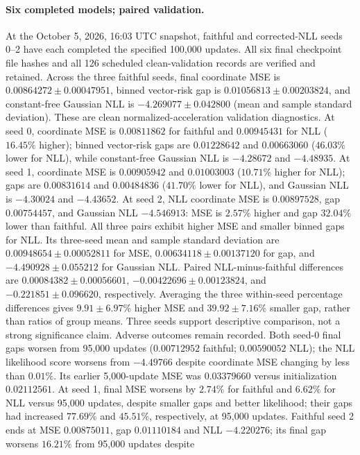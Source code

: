 \paragraph{Six completed models; paired validation.}
At the October 5, 2026, 16:03 UTC snapshot, faithful and corrected-NLL
seeds 0--2 have each completed the specified 100,000 updates.
All six final checkpoint file hashes and all 126 scheduled
clean-validation records are verified and retained. Across the three faithful seeds, final coordinate MSE is
$0.00864272\pm0.00047951$, binned vector-risk gap is
$0.01056813\pm0.00203824$, and constant-free Gaussian NLL is
$-4.269077\pm0.042800$ (mean and sample standard deviation).
These are clean normalized-acceleration validation diagnostics.
At seed 0, coordinate MSE is $0.00811862$ for faithful and $0.00945431$
for NLL ($16.45\%$ higher); binned vector-risk gaps are $0.01228642$ and
$0.00663060$ ($46.03\%$ lower for NLL), while constant-free Gaussian NLL
is $-4.28672$ and $-4.48935$. At seed 1, coordinate MSE is $0.00905942$
and $0.01003003$ ($10.71\%$ higher for NLL); gaps are $0.00831614$ and
$0.00484836$ ($41.70\%$ lower for NLL), and Gaussian NLL is $-4.30024$
and $-4.43652$. At seed 2, NLL coordinate MSE is $0.00897528$,
gap $0.00754457$, and Gaussian NLL $-4.546913$: MSE is $2.57\%$
higher and gap $32.04\%$ lower than faithful. All three pairs
exhibit higher MSE and smaller binned gaps for NLL. Its three-seed
mean and sample standard deviation are $0.00948654\pm0.00052811$
for MSE, $0.00634118\pm0.00137120$ for gap, and
$-4.490928\pm0.055212$ for Gaussian NLL. Paired NLL-minus-faithful
differences are $0.00084382\pm0.00056601$,
$-0.00422696\pm0.00123824$, and $-0.221851\pm0.096620$, respectively.
Averaging the three within-seed percentage differences gives $9.91\pm6.97\%$ higher
MSE and $39.92\pm7.16\%$ smaller gap, rather than ratios of group means.
Three seeds support descriptive comparison, not a strong significance claim.
Adverse outcomes remain recorded. Both seed-0 final gaps worsen from
95,000 updates ($0.00712952$ faithful; $0.00590052$ NLL); the NLL
likelihood score worsens from $-4.49766$ despite coordinate MSE changing
by less than $0.01\%$. Its earlier 5,000-update MSE was $0.03379660$
versus initialization $0.02112561$. At seed 1, final MSE worsens by
$2.74\%$ for faithful and $6.62\%$ for NLL versus 95,000 updates,
despite smaller gaps and better likelihood; their gaps had increased
$77.69\%$ and $45.51\%$, respectively, at 95,000 updates.
Faithful seed 2 ends at MSE $0.00875011$, gap $0.01110184$ and NLL
$-4.220276$; its final gap worsens $16.21\%$ from 95,000 updates despite
